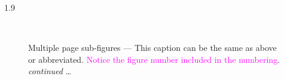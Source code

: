 \documentclass[phd]{ndsu-thesis-2022}
\newcommand\myspacing{1.9} %
\begin{document}
\begin{spacing}{\myspacing}
\begin{figure}[p]
\\
\captionsetup{singlelinecheck=false} %
\caption[]{Multiple page sub-figures --- This caption can be the same as above or abbreviated. \textcolor{magenta}{Notice the figure number included in the numbering}. \emph{continued} \ldots} 
\end{figure}
\clearpage

\begin{figure}[t]\ContinuedFloat
\captionsetup{singlelinecheck=true} %
\renewcommand*{\thesubfigure}{\arabic{subfigure}} %
\centering
{}\hspace{0.5in}
\hspace{0.5in}
\\
\hspace{0.5in}
\hspace{0.5in}

\end{figure}
\end{spacing}
\end{document}
